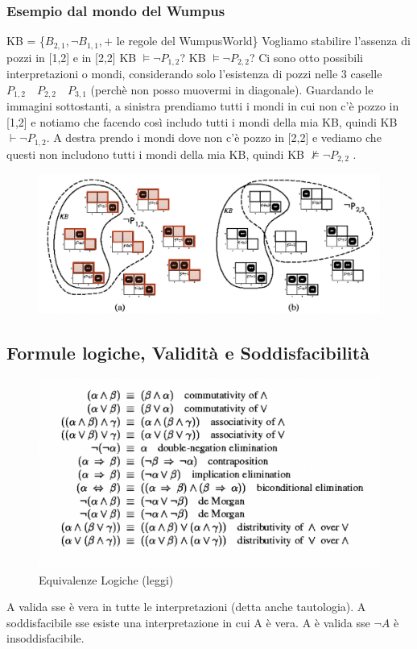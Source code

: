 \documentclass{article}
\begin{document}
\subsubsection{Esempio dal mondo del Wumpus}
KB = \{$B_{2,1}, \neg B_{1,1} , +$ le regole del WumpusWorld\} \newline 
Vogliamo stabilire l’assenza di pozzi in [1,2] e in [2,2] \newline
KB $\models \neg P_{1,2}$? \newline
KB $\models \neg P_{2,2}$? \newline
Ci sono otto possibili interpretazioni o mondi, considerando solo l’esistenza di pozzi nelle 3 caselle $P_{1,2} \quad P_{2,2} \quad P_{3,1}$ (perchè non posso muovermi in diagonale). Guardando le immagini sottostanti, a sinistra prendiamo tutti i mondi in cui non c'è pozzo in [1,2] e notiamo che facendo così includo tutti i mondi della mia KB, quindi KB $\vdash \neg P_{1,2}$. A destra prendo i mondi dove non c'è pozzo in [2,2] e vediamo che questi non includono tutti i mondi della mia KB, quindi KB $\nvDash \neg P_{2,2}$ .
\begin{figure}[h!]
\centering
\includegraphics[scale=0.45]{Images/wumpusconslogica.png}
\end{figure}

\subsection{Formule logiche, Validità e Soddisfacibilità}
\begin{figure}[H]
\centering
\includegraphics[scale=0.35]{Images/formulelogiche.png}
\caption{Equivalenze Logiche (leggi)}
\end{figure}
A valida sse è vera in tutte le interpretazioni (detta anche tautologia). \newline
A soddisfacibile sse esiste una interpretazione in cui A è vera. \newline
A è valida sse $\neg A$ è insoddisfacibile. \newline
\end{document}
